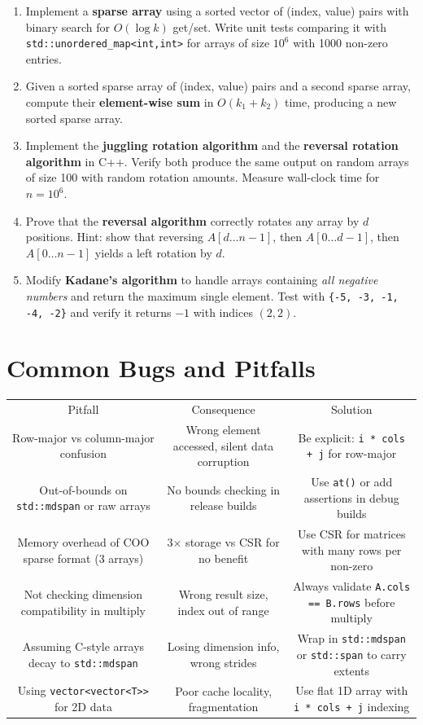 \begin{enumerate}
\item Implement a \textbf{sparse array} using a sorted vector of (index, value) pairs with binary search for $O(\log k)$ get/set. Write unit tests comparing it with \texttt{std::unordered\_map<int,int>} for arrays of size $10^6$ with 1000 non-zero entries.
\item Given a sorted sparse array of (index, value) pairs and a second sparse array, compute their \textbf{element-wise sum} in $O(k_1 + k_2)$ time, producing a new sorted sparse array.
\item Implement the \textbf{juggling rotation algorithm} and the \textbf{reversal rotation algorithm} in C++. Verify both produce the same output on random arrays of size 100 with random rotation amounts. Measure wall-clock time for $n = 10^6$.
\item Prove that the \textbf{reversal algorithm} correctly rotates any array by $d$ positions. Hint: show that reversing $A[d \ldots n{-}1]$, then $A[0 \ldots d{-}1]$, then $A[0 \ldots n{-}1]$ yields a left rotation by $d$.
\item Modify \textbf{Kadane's algorithm} to handle arrays containing \emph{all negative numbers} and return the maximum single element. Test with \texttt{\{-5, -3, -1, -4, -2\}} and verify it returns $-1$ with indices $(2, 2)$.
\end{enumerate}

\section{Common Bugs and Pitfalls}

\begin{center}
\begin{tabular}{ccc}
\toprule
Pitfall & Consequence & Solution \\
Row-major vs column-major confusion & Wrong element accessed, silent data corruption & Be explicit: \texttt{i * cols + j} for row-major \\
Out-of-bounds on \texttt{std::mdspan} or raw arrays & No bounds checking in release builds & Use \texttt{at()} or add assertions in debug builds \\
Memory overhead of COO sparse format (3 arrays) & 3$\times $ storage vs CSR for no benefit & Use CSR for matrices with many rows per non-zero \\
Not checking dimension compatibility in multiply & Wrong result size, index out of range & Always validate \texttt{A.cols == B.rows} before multiply \\
Assuming C-style arrays decay to \texttt{std::mdspan} & Losing dimension info, wrong strides & Wrap in \texttt{std::mdspan} or \texttt{std::span} to carry extents \\
Using \texttt{vector<vector<T>>} for 2D data & Poor cache locality, fragmentation & Use flat 1D array with \texttt{i * cols + j} indexing \\

\bottomrule
\end{tabular}
\end{center}

